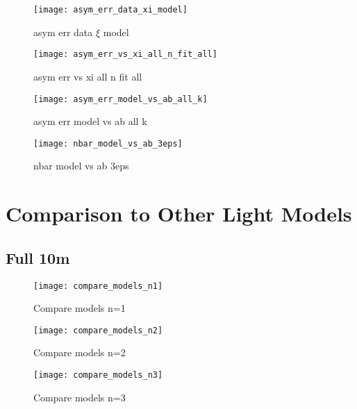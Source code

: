 \begin{figure}[H]
  \centering
  \texttt{[image: asym\_err\_data\_xi\_model]}
  \caption{asym err data $\xi$ model}
  \label{fig:asym_err_data_xi_model}
\end{figure}

\begin{figure}[H]
  \centering
  \texttt{[image: asym\_err\_vs\_xi\_all\_n\_fit\_all]}
  \caption{asym err vs xi all n fit all}
  \label{fig:asym_err_vs_xi_all_n_fit_all}
\end{figure}

\begin{figure}[H]
  \centering
  \texttt{[image: asym\_err\_model\_vs\_ab\_all\_k]}
  \caption{asym err model vs ab all k}
  \label{fig:asym_err_model_vs_ab_all_k}
\end{figure}

\begin{figure}[H]
  \centering
  \texttt{[image: nbar\_model\_vs\_ab\_3eps]}
  \caption{nbar model vs ab 3eps}
  \label{fig:nbar_model_vs_ab_3eps}
\end{figure}


\section{Comparison to Other Light Models}

\subsection{Full 10m}
\begin{figure}[H]
  \centering
  \texttt{[image: compare\_models\_n1]}
  \caption{Compare models n=1}
  \label{fig:compare_models_n1}
\end{figure}
\begin{figure}[H]
  \centering
  \texttt{[image: compare\_models\_n2]}
  \caption{Compare models n=2}
  \label{fig:compare_models_n2}
\end{figure}
\begin{figure}[H]
  \centering
  \texttt{[image: compare\_models\_n3]}
  \caption{Compare models n=3}
  \label{fig:compare_models_n3}
\end{figure}
